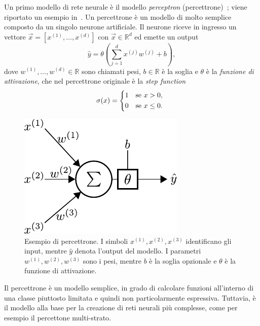 Un primo modello di rete neurale è il modello \emph{perceptron} (percettrone)~\cite{1958_perceptron}; viene riportato un esempio in~.
Un percettrone è un modello di molto semplice composto da un singolo neurone artificiale.
Il neurone riceve in ingresso un vettore $\Vec{x}=[x^{(1)},\dots,x^{(d)}]$ con $\Vec{x} \in \mathbb{R}^d$ ed emette un output 
\begin{equation*}
    \hat{y} = \theta\left(\sum_{j=1}^{d}x^{(j)}w^{(j)} +b\right),
\end{equation*} 
dove $w^{(1)},\dots,w^{(d)} \in \mathbb{R}$ sono chiamati pesi, $b \in \mathbb{R}$ è la soglia e $\theta$ è la \emph{funzione di attivazione}, che nel percettrone originale è la \emph{step function} 
\begin{equation*}
    \sigma(x) =
    \begin{cases*}
      1 & se $x>0$, \\
      0 & se $x\leq0$.
    \end{cases*}
\end{equation*}
\begin{figure}
    \centering
    \includegraphics[width=0.3\linewidth]{img/perceptron.pdf}
    \caption[Esempio percettrone.]{Esempio di percettrone. I simboli $x^{(1)},x^{(2)},x^{(3)}$ identificano gli input, mentre $\hat{y}$ denota l'output del modello. I parametri $w^{(1)},w^{(2)},w^{(3)}$ sono i pesi, mentre $b$ è la soglia opzionale e $\theta$ è la funzione di attivazione.}
    \label{fig:perceptron}
\end{figure}
Il percettrone è un modello semplice, in grado di calcolare funzioni all'interno di una classe piuttosto limitata e quindi non particolarmente espressiva.
Tuttavia, è il modello alla base per la creazione di reti neurali più complesse, come per esempio il percettone multi-strato.

